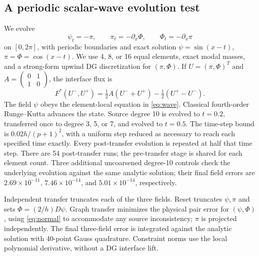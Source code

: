 \documentclass[11pt]{article}
\begin{document}
\subsection{A periodic scalar-wave evolution test}
We evolve
\begin{equation}\label{eq:wave}
 \psi_t=-\pi,\qquad \pi_t=-\partial_x\Phi,\qquad \Phi_t=-\partial_x\pi
\end{equation}
on \([0,2\pi]\), with periodic boundaries and exact solution \(\psi=\sin(x-t)\), \(\pi=\Phi=\cos(x-t)\). We use 4, 8, or 16 equal elements, exact modal masses, and a strong-form upwind DG discretization for \((\pi,\Phi)\). If \(U=(\pi,\Phi)^T\) and \(A=\left(\begin{smallmatrix}0&1\\1&0\end{smallmatrix}\right)\), the interface flux is
\begin{equation}
 F^*(U^-,U^+)=\tfrac12 A(U^-+U^+)-\tfrac12(U^+-U^-).
\end{equation}
The field \(\psi\) obeys the element-local equation in \eqref{eq:wave}. Classical fourth-order Runge--Kutta advances the state. Source degree 10 is evolved to \(t=0.2\), transferred once to degree 3, 5, or 7, and evolved to \(t=0.5\). The time-step bound is \(0.02h/(p+1)^2\), with a uniform step reduced as necessary to reach each specified time exactly. Every post-transfer evolution is repeated at half that time step. There are 54 post-transfer runs; the pre-transfer stage is shared for each element count. Three additional uncoarsened degree-10 controls check the underlying evolution against the same analytic solution; their final field errors are \(2.69\times10^{-11}\), \(7.46\times10^{-14}\), and \(5.01\times10^{-14}\), respectively.

Independent transfer truncates each of the three fields. Reset truncates \(\psi,\pi\) and sets \(\Phi=(2/h)D\psi\). Graph transfer minimizes the physical pair error for \((\psi,\Phi)\), using \eqref{eq:normal} to accommodate any source inconsistency; \(\pi\) is projected independently. The final three-field error is integrated against the analytic solution with 40-point Gauss quadrature. Constraint norms use the local polynomial derivative, without a DG interface lift.
\end{document}
